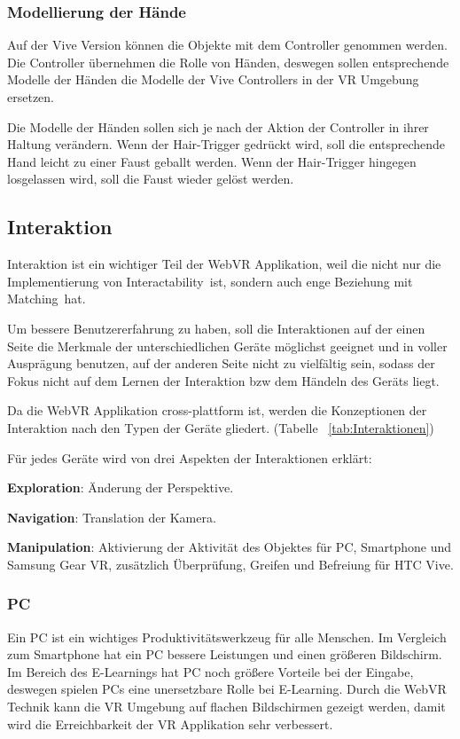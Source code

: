    \subsubsection{Modellierung der Hände}
   Auf der Vive Version können die Objekte mit dem Controller genommen werden. Die Controller übernehmen die Rolle von Händen, deswegen sollen entsprechende Modelle der Händen die Modelle der Vive Controllers in der VR Umgebung ersetzen.
   
   Die Modelle der Händen sollen sich je nach der Aktion der Controller in ihrer Haltung verändern. Wenn der Hair-Trigger gedrückt wird, soll die entsprechende Hand leicht zu einer Faust geballt werden. Wenn der Hair-Trigger hingegen losgelassen wird, soll die Faust wieder gelöst werden.

 \subsection{Interaktion}
 Interaktion ist ein wichtiger Teil der WebVR Applikation, weil die nicht nur die Implementierung von \glqq Interactability\grqq\ ist, sondern auch enge Beziehung mit \glqq Matching\grqq\ hat.
 
 Um bessere Benutzererfahrung zu haben, soll die Interaktionen auf der einen Seite die Merkmale der unterschiedlichen Geräte möglichst geeignet und in voller Ausprägung benutzen, auf der anderen Seite nicht zu vielfältig sein, sodass der Fokus nicht auf dem Lernen der Interaktion bzw dem Händeln des Geräts liegt. 
 
 Da die WebVR Applikation cross-plattform ist, werden die Konzeptionen der Interaktion nach den Typen der Geräte gliedert. (Tabelle ~\ref{tab:Interaktionen})

 Für jedes Geräte wird von drei Aspekten der Interaktionen erklärt:
 
 \textbf{Exploration}: Änderung der Perspektive.
 
 \textbf{Navigation}: Translation der Kamera.
 
 \textbf{Manipulation}: Aktivierung der Aktivität des Objektes für PC, Smartphone und Samsung Gear VR, zusätzlich Überprüfung, Greifen und Befreiung für HTC Vive.

 \subsubsection{PC}
 Ein PC ist ein wichtiges Produktivitätswerkzeug für alle Menschen. Im Vergleich zum Smartphone hat ein PC bessere Leistungen und einen größeren Bildschirm. Im Bereich des E-Learnings hat PC noch größere Vorteile bei der Eingabe, deswegen spielen PCs eine unersetzbare Rolle bei E-Learning. Durch die WebVR Technik kann die VR Umgebung auf flachen Bildschirmen gezeigt werden, damit wird die Erreichbarkeit der VR Applikation sehr verbessert. 
  
